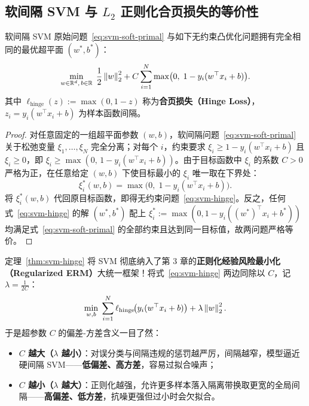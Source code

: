 \subsection{软间隔 SVM 与 $L_2$ 正则化合页损失的等价性}

\begin{thmBox}
\begin{theorem}\label{thm:svm-hinge}
软间隔 SVM 原始问题~\eqref{eq:svm-soft-primal} 与如下无约束凸优化问题拥有完全相同的最优超平面 $(w^*, b^*)$：
\begin{equation}\label{eq:svm-hinge}
  \min_{w \in \mathbb{R}^d,\, b \in \mathbb{R}}\; \frac{1}{2}\left\|w\right\|_2^2 + C \sum_{i=1}^{N} \max\!\big(0,\; 1 - y_i(w^\top x_i + b)\big).
\end{equation}
其中 $\ell_{\mathrm{hinge}}(z) := \max(0, 1 - z)$ 称为\textbf{合页损失（Hinge Loss）}，$z_i = y_i(w^\top x_i + b)$ 为样本函数间隔。
\end{theorem}
\end{thmBox}

\begin{proof}
对任意固定的一组超平面参数 $(w, b)$，软间隔问题~\eqref{eq:svm-soft-primal} 关于松弛变量 $\xi_1, \dots, \xi_N$ 完全分离；对每个 $i$，约束要求 $\xi_i \ge 1 - y_i(w^\top x_i + b)$ 且 $\xi_i \ge 0$，即 $\xi_i \ge \max(0,\, 1 - y_i(w^\top x_i + b))$。由于目标函数中 $\xi_i$ 的系数 $C > 0$ 严格为正，在任意给定 $(w, b)$ 下使目标最小的 $\xi_i$ 唯一取在下界处：
\[
  \xi_i^*(w, b) = \max\!\big(0,\; 1 - y_i(w^\top x_i + b)\big).
\]
将 $\xi_i^*(w, b)$ 代回原目标函数，即得无约束问题~\eqref{eq:svm-hinge}。反之，任何式~\eqref{eq:svm-hinge} 的解 $(w^*, b^*)$ 配上 $\xi_i^* := \max(0, 1 - y_i((w^*)^\top x_i + b^*))$ 均满足式~\eqref{eq:svm-soft-primal} 的全部约束且达到同一目标值，故两问题严格等价。
\end{proof}

定理~\ref{thm:svm-hinge} 将 SVM 彻底纳入了第 3 章的\textbf{正则化经验风险最小化（Regularized ERM）}大统一框架！将式~\eqref{eq:svm-hinge} 两边同除以 $C$，记 $\lambda = \frac{1}{2C}$：
\[
  \min_{w, b}\; \sum_{i=1}^{N} \ell_{\mathrm{hinge}}\!\big(y_i(w^\top x_i + b)\big) + \lambda \left\|w\right\|_2^2.
\]
于是超参数 $C$ 的偏差-方差含义一目了然：
\begin{itemize}
  \item \textbf{$C$ 越大（$\lambda$ 越小）}：对误分类与间隔违规的惩罚越严厉，间隔越窄，模型逼近硬间隔 SVM——\textbf{低偏差、高方差}，容易过拟合噪声；
  \item \textbf{$C$ 越小（$\lambda$ 越大）}：正则化越强，允许更多样本落入隔离带换取更宽的全局间隔——\textbf{高偏差、低方差}，抗噪更强但过小时会欠拟合。
\end{itemize}

